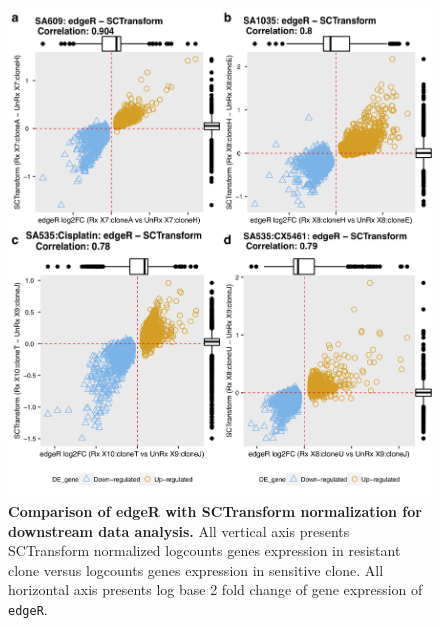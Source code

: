 \begin{figure}
\centering
\includegraphics[width=\textwidth]{Figures/chap5/edgeRSCTransformcorrelation.png}
	
\caption[Evaluation of \texttt{edgeR} in all PDX timeseries data.]
	{\small
	\textbf{Comparison of edgeR with SCTransform normalization for downstream data analysis.}
All vertical axis presents SCTransform normalized logcounts genes expression in resistant clone versus logcounts genes expression in sensitive clone. All horizontal axis presents log base 2 fold change of gene expression of \texttt{edgeR}.	
	}
	\label{fig:edgeRsctransformcorrelation}
\end{figure}




